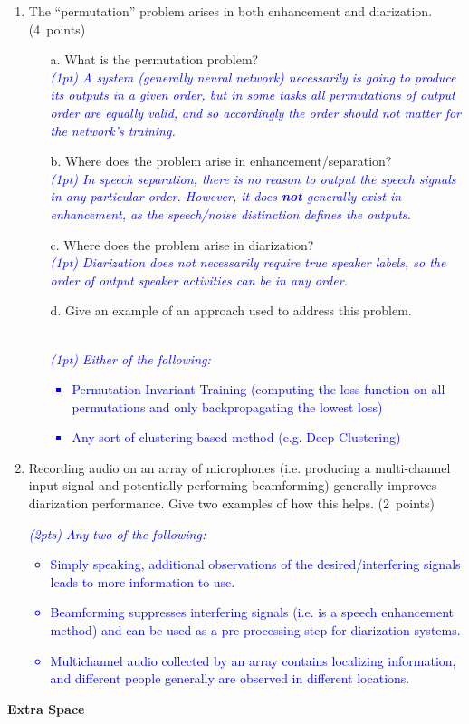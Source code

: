 \documentclass[12pt]{article}
\newcommand{\solution}[2]{\textcolor{blue}{\em #1}} %
\begin{document}
\begin{enumerate}
\newpage
\item The ``permutation'' problem arises in both enhancement and diarization. \hfill (4~points)
\begin{enumerate}
    \item[a.] What is the permutation problem?
    \solution{ \\
    (1pt) A system (generally neural network) necessarily is going to produce its outputs in a given order, but in some tasks all permutations of output order are equally valid, and so accordingly the order should not matter for the network's training.
    }{\vspace{2cm}}
    \item[b.] Where does the problem arise in enhancement/separation?
    \solution{ \\
    (1pt) In speech separation, there is no reason to output the speech signals in any particular order. However, it does \textbf{not} generally exist in enhancement, as the speech/noise distinction defines the outputs.
    }{\vspace{2cm}}
    \item[c.] Where does the problem arise in diarization?
    \solution{ \\
    (1pt) Diarization does not necessarily require true speaker labels, so the order of output speaker activities can be in any order.
    }{\vspace{2cm}}
    \item[d.] Give an example of an approach used to address this problem.
    \solution{ \\
    (1pt) Either of the following:
    \begin{itemize}
        \item Permutation Invariant Training (computing the loss function on all permutations and only backpropagating the lowest loss)
        \item Any sort of clustering-based method (e.g. Deep Clustering)
    \end{itemize}
    }{\vspace{2cm}}
\end{enumerate}

\item Recording audio on an array of microphones (i.e. producing a multi-channel input signal and potentially performing beamforming) generally improves diarization performance. Give two examples of how this helps. \hfill (2~points) \\
\solution{
(2pts) Any two of the following:
\begin{itemize}
    \item Simply speaking, additional observations of the desired/interfering signals leads to more information to use.
    \item Beamforming suppresses interfering signals (i.e. is a speech enhancement method) and can be used as a pre-processing step for diarization systems.
    \item Multichannel audio collected by an array contains localizing information, and different people generally are observed in different locations.
\end{itemize}
}{\vspace{4cm}}

\end{enumerate}

\newpage

\textbf{\Large Extra Space}
\end{document}
